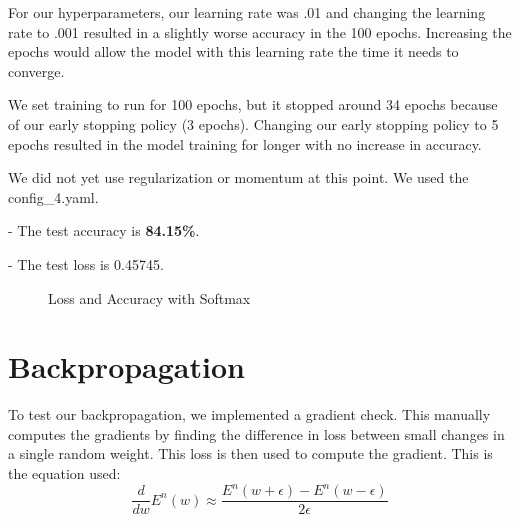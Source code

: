 \documentclass{article}
\begin{document}
For our hyperparameters, our learning rate was .01 and changing the learning rate to .001 resulted in a slightly worse accuracy in the 100 epochs. Increasing the epochs would allow the model with this learning rate the time it needs to converge.


We set training to run for 100 epochs, but it stopped around 34 epochs because of our early stopping policy (3 epochs). Changing our early stopping policy to 5 epochs resulted in the model training for longer with no increase in accuracy.

We did not yet use regularization or momentum at this point. We used the config\_4.yaml. 




- The test accuracy is \textbf{84.15\%}.

- The test loss is 0.45745.


\begin{figure}[h!]
    \centering
    \hfill
    \caption{Loss and Accuracy with Softmax}
    \label{fig:loss_acc_softmax}
\end{figure}



\section{Backpropagation}
To test our backpropagation, we implemented a gradient check. This manually computes the gradients by finding the difference in loss between small changes in a single random weight. This loss is then used to compute the gradient. 
This is the equation used: 
\[
\frac{d}{dw} E^n(w) \approx \frac{E^n(w + \epsilon) - E^n(w - \epsilon)}{2\epsilon}
\]
\end{document}

